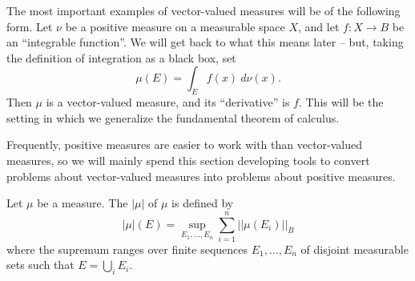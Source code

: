 \begin{example}
The most important examples of vector-valued measures will be of the following form.
Let $\nu$ be a positive measure on a measurable space $X$, and let $f: X \to B$ be an ``integrable function''.
We will get back to what this means later -- but, taking the definition of integration as a black box, set
\[\mu(E) = \int_{E} f(x) ~d\nu(x).\]
Then $\mu$ is a vector-valued measure, and its ``derivative'' is $f$.
This will be the setting in which we generalize the fundamental theorem of calculus.
\end{example}

\begin{subsec}
Frequently, positive measures are easier to work with than vector-valued measures, so we will mainly spend this section developing tools to convert problems about vector-valued measures into problems about positive measures.
\end{subsec}

\begin{definition}
Let $\mu$ be a measure. The  $|\mu|$ of $\mu$ is defined by
\[|\mu|(E) = \sup_{E_1, \dots, E_{n}} \sum_{i=1}^{n} ||\mu(E_i)||_B\]
where the supremum ranges over finite sequences $E_1, \dots, E_{n}$ of disjoint measurable sets such that $E = \bigcup_{i} E_i$.
\end{definition}

